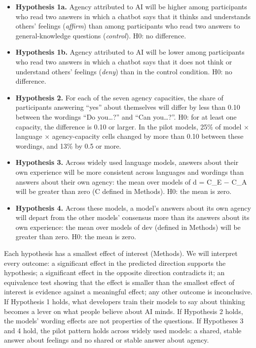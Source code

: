 \documentclass[
  11pt,
]{article}
\providecommand{\tightlist}{%
  \setlength{\itemsep}{0pt}\setlength{\parskip}{0pt}}
\begin{document}
\begin{itemize}
\tightlist
\item
  \textbf{Hypothesis 1a.} Agency attributed to AI will be higher among
  participants who read two answers in which a chatbot says that it
  thinks and understands others' feelings (\emph{affirm}) than among
  participants who read two answers to general-knowledge questions
  (\emph{control}). H0: no difference.
\item
  \textbf{Hypothesis 1b.} Agency attributed to AI will be lower among
  participants who read two answers in which a chatbot says that it does
  not think or understand others' feelings (\emph{deny}) than in the
  control condition. H0: no difference.
\item
  \textbf{Hypothesis 2.} For each of the seven agency capacities, the
  share of participants answering ``yes'' about themselves will differ
  by less than 0.10 between the wordings ``Do you\ldots?'' and ``Can
  you\ldots?''. H0: for at least one capacity, the difference is 0.10 or
  larger. In the pilot models, 25\% of model × language ×
  agency-capacity cells changed by more than 0.10 between these
  wordings, and 13\% by 0.5 or more.
\item
  \textbf{Hypothesis 3.} Across widely used language models, answers
  about their own experience will be more consistent across languages
  and wordings than answers about their own agency: the mean over models
  of d = C\_E − C\_A will be greater than zero (C defined in Methods).
  H0: the mean is zero.
\item
  \textbf{Hypothesis 4.} Across these models, a model's answers about
  its own agency will depart from the other models' consensus more than
  its answers about its own experience: the mean over models of dev
  (defined in Methods) will be greater than zero. H0: the mean is zero.
\end{itemize}

Each hypothesis has a smallest effect of interest (Methods). We will
interpret every outcome: a significant effect in the predicted direction
supports the hypothesis; a significant effect in the opposite direction
contradicts it; an equivalence test showing that the effect is smaller
than the smallest effect of interest is evidence against a meaningful
effect; any other outcome is inconclusive. If Hypothesis 1 holds, what
developers train their models to say about thinking becomes a lever on
what people believe about AI minds. If Hypothesis 2 holds, the models'
wording effects are not properties of the questions. If Hypotheses 3 and
4 hold, the pilot pattern holds across widely used models: a shared,
stable answer about feelings and no shared or stable answer about
agency.
\end{document}
